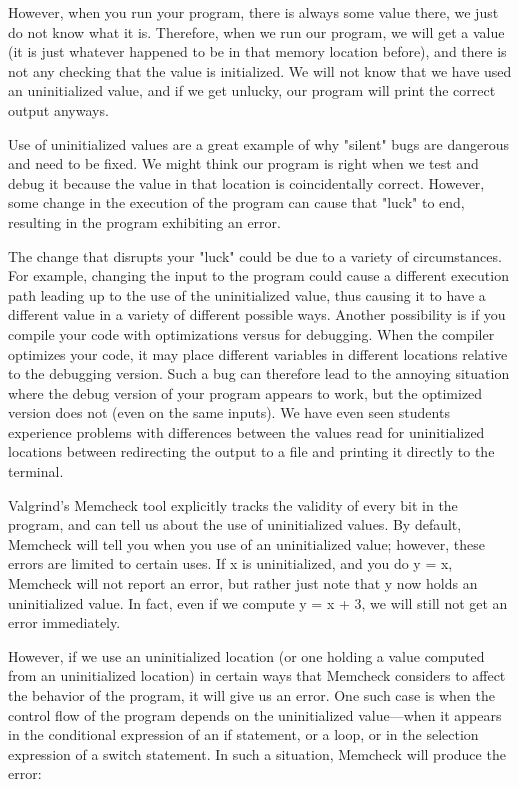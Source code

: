 \documentclass[11pt, a4paper]{article}
\begin{document}
However, when you run your program, there is always some value there, we just do not know what it is. Therefore, when we run our program, we will get a value (it is just whatever happened to be in that memory location before), and there is not any checking that the value is initialized. We will not know that we have used an uninitialized value, and if we get unlucky, our program will print the correct output anyways.

Use of uninitialized values are a great example of why "silent" bugs are dangerous and need to be fixed. We might think our program is right when we test and debug it because the value in that location is coincidentally correct. However, some change in the execution of the program can cause that "luck" to end, resulting in the program exhibiting an error.

The change that disrupts your "luck" could be due to a variety of circumstances. For example, changing the input to the program could cause a different execution path leading up to the use of the uninitialized value, thus causing it to have a different value in a variety of different possible ways. Another possibility is if you compile your code with optimizations versus for debugging. When the compiler optimizes your code, it may place different variables in different locations relative to the debugging version. Such a bug can therefore lead to the annoying situation where the debug version of your program appears to work, but the optimized version does not (even on the same inputs). We have even seen students experience problems with differences between the values read for uninitialized locations between redirecting the output to a file and printing it directly to the terminal.

Valgrind’s Memcheck tool explicitly tracks the validity of every bit in the program, and can tell us about the use of uninitialized values. By default, Memcheck will tell you when you use of an uninitialized value; however, these errors are limited to certain uses. If x is uninitialized, and you do y = x, Memcheck will not report an error, but rather just note that y now holds an uninitialized value. In fact, even if we compute y = x + 3, we will still not get an error immediately.

However, if we use an uninitialized location (or one holding a value computed from an uninitialized location) in certain ways that Memcheck considers to affect the behavior of the program, it will give us an error. One such case is when the control flow of the program depends on the uninitialized value—when it appears in the conditional expression of an if statement, or a loop, or in the selection expression of a switch statement. In such a situation, Memcheck will produce the error:
\end{document}
